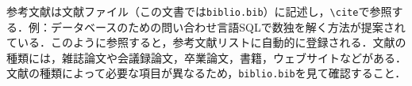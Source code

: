 参考文献は文献ファイル（この文書では\verb|biblio.bib|）に記述し，\verb|\cite|で参照する．例：データベースのための問い合わせ言語SQLで数独を解く方法が提案されている\cite{yabuki2011}．このように参照すると，参考文献リストに自動的に登録される．文献の種類には，雑誌論文\cite{yabuki2011}や会議録論文\cite{yabuki2013}，卒業論文\cite{kubo2014}，書籍\cite{okumura2013}，ウェブサイト\cite{self}などがある．文献の種類によって必要な項目が異なるため，\verb|biblio.bib|を見て確認すること．



